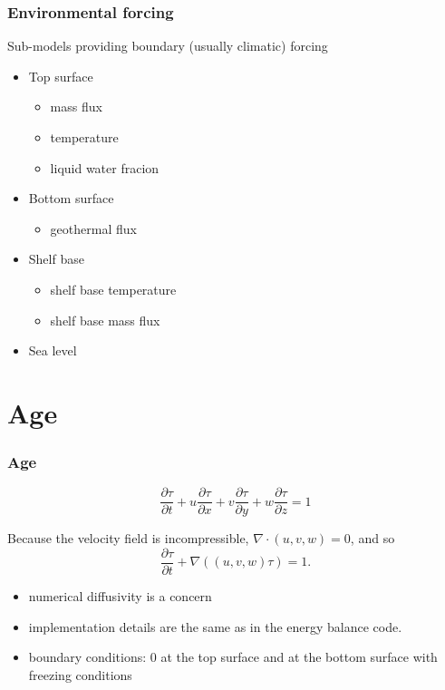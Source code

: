 \documentclass[hide notes,intlimits]{beamer}
\begin{document}
\begin{frame}
  \frametitle{Environmental forcing}

  Sub-models providing boundary (usually climatic) forcing

  \begin{itemize}
  \item Top surface
    \begin{itemize}
    \item mass flux
    \item temperature
    \item liquid water fracion
    \end{itemize}
  \item Bottom surface
    \begin{itemize}
    \item geothermal flux
    \end{itemize}
  \item Shelf base
    \begin{itemize}
    \item shelf base temperature
    \item shelf base mass flux
    \end{itemize}
  \item Sea level
  \end{itemize}
\end{frame}


\section{Age}
\label{sec:age}

\begin{frame}
  \frametitle{Age}

  \begin{equation*}
    \frac{\partial \tau}{\partial t} + u \frac{\partial \tau}{\partial x}
    + v \frac{\partial \tau}{\partial y} + w \frac{\partial \tau}{\partial z} = 1
  \end{equation*}

  Because the velocity field is incompressible, $\nabla \cdot (u,v,w) = 0$, and so
  \begin{equation*}
    \frac{\partial \tau}{\partial t} + \nabla \left( (u,v,w) \tau \right) = 1.
  \end{equation*}

  \begin{itemize}
  \item numerical diffusivity is a concern
  \item implementation details are the same as in the energy balance code.
  \item boundary conditions: $0$ at the top surface and at the bottom
    surface with freezing conditions
  \end{itemize}

\end{frame}
\end{document}
